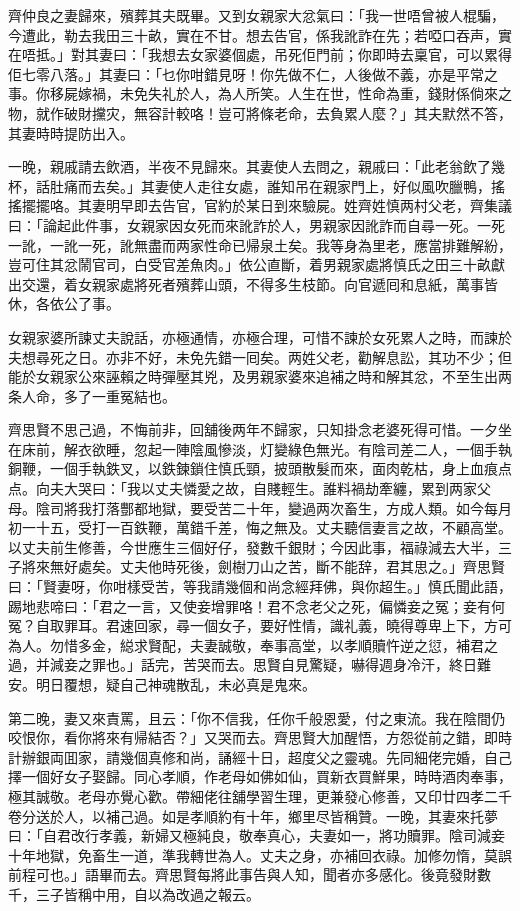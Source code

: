 \documentclass[a5paper, 12pt, openany]{book} %
\begin{document}
	齊仲良之妻歸來，殯葬其夫既畢。又到女親家大忿氣曰：「我一世唔曾被人棍騙，今遭此，勒去我田三十畝，實在不甘。想去告官，係我訛詐在先；若啞口吞声，實在唔抵。」對其妻曰：「我想去女家婆個處，吊死佢門前；你即時去稟官，可以累得佢七零八落。」其妻曰：「乜你咁錯見呀！你先做不仁，人後做不義，亦是平常之事。你移屍嫁禍，未免失礼於人，為人所笑。人生在世，性命為重，錢財係倘來之物，就作破財攩灾，無容計較咯！豈可將條老命，去負累人麼？」其夫默然不答，其妻時時提防出入。

	一晚，親戚請去飲酒，半夜不見歸來。其妻使人去問之，親戚曰：「此老翁飲了幾杯，話肚痛而去矣。」其妻使人走往女處，誰知吊在親家門上，好似風吹臘鴨，搖搖擺擺咯。其妻明早即去告官，官約於某日到來驗屍。姓齊姓慎两村父老，齊集議曰：「論起此件事，女親家因女死而來訛詐於人，男親家因訛詐而自尋一死。一死一訛，一訛一死，訛無盡而两家性命已帰泉土矣。我等身為里老，應當排難解紛，豈可住其忿鬧官司，白受官差魚肉。」依公直斷，着男親家處將慎氏之田三十畝獻出交還，着女親家處將死者殯葬山頭，不得多生枝節。向官遞囘和息紙，萬事皆休，各依公了事。

	女親家婆所諫丈夫說話，亦極通情，亦極合理，可惜不諫於女死累人之時，而諫於夫想尋死之日。亦非不好，未免先錯一囘矣。两姓父老，勸解息訟，其功不少；但能於女親家公來誣賴之時彈壓其兇，及男親家婆來追補之時和解其忿，不至生出两条人命，多了一重冤結也。

	齊思賢不思己過，不悔前非，回舖後两年不歸家，只知掛念老婆死得可惜。一夕坐在床前，解衣欲睡，忽起一陣陰風慘淡，灯變綠色無光。有陰司差二人，一個手執銅鞭，一個手執鉄叉，以鉄鍊鎖住慎氏頸，披頭散髮而來，面肉乾枯，身上血痕点点。向夫大哭曰：「我以丈夫憐愛之故，自賤輕生。誰料禍劫牽纏，累到两家父母。陰司將我打落酆都地獄，要受苦二十年，變過两次畜生，方成人類。如今每月初一十五，受打一百鉄鞭，萬錯千差，悔之無及。丈夫聽信妻言之故，不顧高堂。以丈夫前生修善，今世應生三個好仔，發數千銀財；今因此事，福祿減去大半，三子將來無好處矣。丈夫他時死後，劍樹刀山之苦，斷不能辞，君其思之。」齊思賢曰：「賢妻呀，你咁樣受苦，等我請幾個和尚念經拜佛，與你超生。」慎氏聞此語，踢地悲啼曰：「君之一言，又使妾增罪咯！君不念老父之死，偏憐妾之冤；妾有何冤？自取罪耳。君速回家，尋一個女子，要好性情，識礼義，曉得尊卑上下，方可為人。勿惜多金，縂求賢配，夫妻誠敬，奉事高堂，以孝順贖忤逆之愆，補君之過，并減妾之罪也。」話完，苦哭而去。思賢自見驚疑，嚇得週身冷汗，終日難安。明日覆想，疑自己神魂散乱，未必真是鬼來。

	第二晚，妻又來責罵，且云：「你不信我，任你千般恩愛，付之東流。我在陰間仍咬恨你，看你將來有帰結否？」又哭而去。齊思賢大加醒悟，方怨從前之錯，即時計辦銀両囬家，請幾個真修和尚，誦經十日，超度父之靈魂。先同細佬完婚，自己擇一個好女子娶歸。同心孝順，作老母如佛如仙，買新衣買鮮果，時時酒肉奉事，極其誠敬。老母亦覺心歡。帶細佬往舖學習生理，更兼發心修善，又印廿四孝二千卷分送於人，以補己過。如是孝順約有十年，鄉里尽皆稱贊。一晚，其妻來托夢曰：「自君改行孝義，新婦又極純良，敬奉真心，夫妻如一，將功贖罪。陰司減妾十年地獄，免畜生一道，準我轉世為人。丈夫之身，亦補回衣祿。加修勿惰，莫誤前程可也。」語畢而去。齊思賢每將此事告與人知，聞者亦多感化。後竟發財數千，三子皆稱中用，自以為改過之報云。
\end{document}
